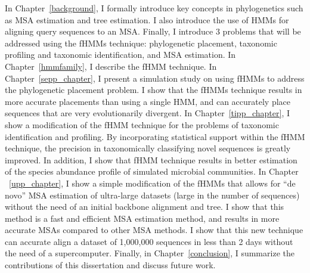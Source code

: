 In Chapter~\ref{background}, I formally introduce key concepts in phylogenetics such as MSA estimation and tree estimation.  I also introduce the use of HMMs for aligning query sequences to an MSA.  Finally, I introduce 3 problems that will be addressed using the fHMMs technique: phylogenetic placement, taxonomic profiling and taxonomic identification, and MSA estimation.  In Chapter~\ref{hmmfamily}, I describe the fHMM technique.  In Chapter~\ref{sepp_chapter}, I present a simulation study on using fHMMs to address the phylogenetic placement problem.  I show that the fHMMs technique results in more accurate placements than using a single HMM, and can accurately place sequences that are very evolutionarily divergent.  In Chapter~\ref{tipp_chapter}, I show a modification of the fHMM technique for the problems of taxonomic identification and profiling.  By incorporating statistical support within the fHMM technique, the precision in taxonomically classifying novel sequences is greatly improved.  In addition, I show that fHMM technique results in better estimation of the species abundance profile of simulated microbial communities.  In Chapter ~\ref{upp_chapter}, I show a simple modification of the fHMMs that allows for ``de novo'' MSA estimation of ultra-large datasets (large in the number of sequences) without the need of an initial backbone alignment and tree.  I show that this method is a fast and efficient MSA estimation method, and results in more accurate MSAs compared to other MSA methods.  I show that this new technique can accurate align a dataset of 1,000,000 sequences in less than 2 days without the need of a supercomputer.  Finally, in Chapter~\ref{conclusion}, I summarize the contributions of this dissertation and discuss future work.
